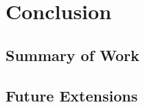\chapter{Conclusion} \label{chapter:conclusion}
\section{Summary of Work}
\section{Future Extensions} %